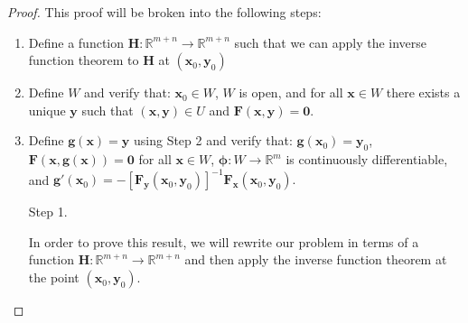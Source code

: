 \documentclass{article}
\newcommand{\R}{\mathbb{R}}
\newcommand{\x}{\mathbf{x}}
\newcommand{\F}{\mathbf{F}}
\newcommand{\y}{\mathbf{y}}
\newcommand{\g}{\mathbf{g}}
\newcommand{\ze}{\mathbf{0}}
\theoremstyle{definition}
\begin{document}
	\begin{proof}
		This proof will be broken into the following steps: 
		\begin{enumerate}
			\item Define a function $ \mathbf H:\R^{m+n}\to \R^{m+n} $ such that we can apply the inverse function theorem to $ \mathbf H $ at $ (\x_0,\y_0) $
			\item Define $ W $ and verify that: $ \x_0\in W $, $ W $ is open, and for all $ \x\in W $ there exists a unique $ \y $ such that $ (\x,\y)\in U $ and $ \F(\x,\y)=\ze $. 
			\item Define $ \g(\x) =\y$ using Step 2 and verify that: $ \g(\x_0)=\y_0 $, $ \mathbf F(\x,\g(\x))=\ze $ for all $ \x\in W $,  $ \boldsymbol{\phi}:W\to\R^m $ is continuously differentiable, and
			$ \g'(\x_0) = -[\mathbf F_\y(\x_0,\y_0)]^{-1}\mathbf F_\x(\x_0,\y_0).$
		\end{enumerate}
		\begin{enumerate}
			\item [Step 1.]
			
			In order to prove this result, we will rewrite our problem in terms of a function $ \mathbf H:\R^{m+n}\to \R^{m+n} $ and then apply the inverse function theorem at the point $ (\x_0,\y_0) $. 
			

\end{enumerate}
\end{proof}
\end{document}
